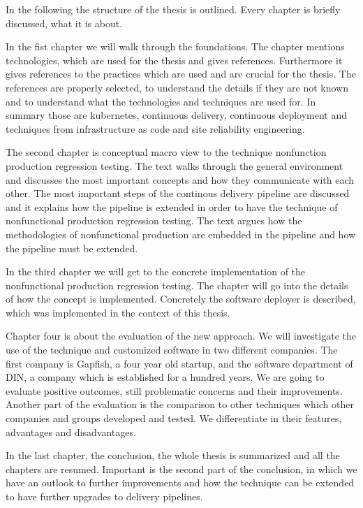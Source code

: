 In the following the structure of the thesis is outlined. Every chapter is briefly
discussed, what it is about.

In the fist chapter we will walk through the foundations. The chapter mentions
technologies, which are used for the thesis and gives references. Furthermore it gives
references to the practices which are used and are crucial for the thesis. The references
are properly selected, to understand the details if they are not known and to understand
what the technologies and techniques are used for. In summary those are kubernetes,
continuous delivery, continuous deployment and techniques from infrastructure as code and
site reliability engineering.

The second chapter is conceptual macro view to the technique nonfunction production
regression testing. The text walks through the general environment and discusses the most
important concepts and how they communicate with each other. The most important steps of
the continous delivery pipeline are discussed and it explains how the pipeline is extended
in order to have the technique of nonfunctional production regression testing. The text
argues how the methodologies of nonfunctional production are embedded in the pipeline and
how the pipeline must be extended.

In the third chapter we will get to the concrete implementation of the nonfunctional
production regression testing. The chapter will go into the details of how the concept is
implemented. Concretely the software deployer is described, which was implemented in the
context of this thesis.

Chapter four is about the evaluation of the new approach. We will investigate the use of
the technique and customized software in two different companies. The first company is
Gapfish, a four year old startup, and the software department of DIN, a company which is
established for a hundred years. We are going to evaluate positive outcomes, still
problematic concerns and their improvements. Another part of the evaluation is the
comparison to other techniques which other companies and groups developed and tested. We
differentiate in their features, advantages and disadvantages.

In the last chapter, the conclusion, the whole thesis is summarized and all the chapters
are resumed. Important is the second part of the conclusion, in which we have an outlook
to further improvements and how the technique can be extended to have further upgrades to
delivery pipelines.

